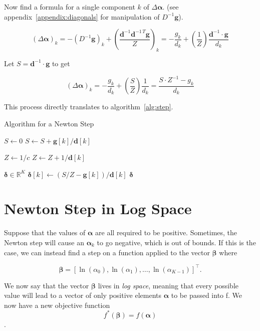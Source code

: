 \documentclass[twoside]{article}
\begin{document}
Now find a formula for a single component $k$ of $\Delta \boldsymbol{\alpha}$. (see appendix~\ref{appendix:diagonals} for manipulation of $D^{-1} \boldsymbol{g}$).

\[
\left(\Delta \boldsymbol{\alpha}\right)_k = - \left(D^{-1} \boldsymbol{g}\right)_k + \left(\frac{\boldsymbol{d}^{-1} \boldsymbol{d}^{-1\,T}\boldsymbol{g}}{Z}\right)_k
= - \frac{g_k}{d_k} + \left(\frac{1}{Z}\right)
 \frac{\boldsymbol{d}^{-1} \cdot \boldsymbol{g}}{d_k}
\]

Let $S = \boldsymbol{d}^{-1} \cdot \boldsymbol{g}$ to get

\[
\left(\Delta \boldsymbol{\alpha}\right)_k = - \frac{g_k}{d_k} + \left(\frac{S}{Z}\right)
\frac{1}{d_k} = \frac{S \cdot Z^{-1} - g_k}{d_k}
\]

This process directly translates to algorithm~\ref{alg:step}.

\begin{algorithm}
  \caption{Algorithm for a Newton Step}
  \begin{algorithmic}
  \State $S \leftarrow 0$
    \State $S \leftarrow S + \mathbf{g}[k] / \mathbf{d}[k]$
  \EndFor

  \State $Z \leftarrow 1/c$
    \State $Z \leftarrow Z + 1 / \mathbf{d}[k]$
  \EndFor
  
  \State $\mathbf{\delta} \in \mathbb{R}^{K}$
    \State $\mathbf{\delta}[k] \gets (S/Z - \mathbf{g}[k]) / \mathbf{d}[k]$
  \EndFor
  \State \Return $\mathbf{\delta}$
  \EndFunction
  \end{algorithmic}
  \label{alg:step}
\end{algorithm}

\section{Newton Step in Log Space}

Suppose that the values of $\boldsymbol{\alpha}$ are all required to be positive. Sometimes, the Newton step will cause an $\boldsymbol{\alpha}_k$ to go negative, which is out of bounds. If this is the case, we can instead find a step on a function applied to the vector $\boldsymbol{\beta}$ where

\[
   \boldsymbol{\beta} = [\ln({\alpha}_0), \ln({\alpha}_1), \dots, \ln({\alpha}_{K - 1})]^\top.
\]

We now say that the vector \(\boldsymbol{\beta}\) lives in \textit{log space}, meaning that every possible value will lead to a vector of only positive elements $\boldsymbol{\alpha}$ to be passed into f. We now have a new objective function \[f^*(\boldsymbol{\beta}) = f(\boldsymbol{\alpha})\].
\end{document}
